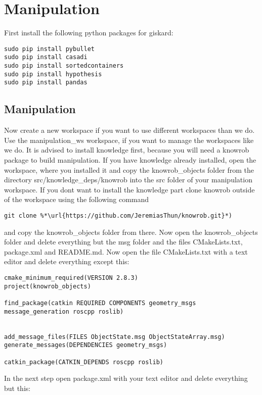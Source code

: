\documentclass[main.tex]{subfiles}
\begin{document}
\section{Manipulation}
\label{sec:Manipulation}

First install the following python packages for giskard:\\

\begin{lstlisting}
sudo pip install pybullet
sudo pip install casadi
sudo pip install sortedcontainers
sudo pip install hypothesis
sudo pip install pandas
\end{lstlisting}
	
	\subsection{Manipulation}
Now create a new workspace if you want to use different workspaces than we do. Use the manipulation\_ws workspace, if you want to manage the workspaces like we do.
It is advised to install knowledge first, because you will need a knowrob package to build manipulation.
If you have knowledge already installed, open the workspace, where you installed it and copy the knowrob\_objects folder from the directory src/knowledge\_deps/knowrob into the src folder of your manipulation workspace. If you dont want to install the knowledge part clone knowrob outside of the workspace using the following command\\
\begin{lstlisting}
git clone %*\url{https://github.com/JeremiasThun/knowrob.git}*)
\end{lstlisting}
and copy the knowrob\_objects folder from there.
 Now open the knowrob\_objects folder and delete everything but  the msg folder and the files CMakeLists.txt, package.xml and README.md.
Now open the file CMakeLists.txt with a text editor and delete everything except this:\\
\begin{lstlisting}
cmake_minimum_required(VERSION 2.8.3)
project(knowrob_objects)

find_package(catkin REQUIRED COMPONENTS geometry_msgs message_generation roscpp roslib)


add_message_files(FILES ObjectState.msg ObjectStateArray.msg)
generate_messages(DEPENDENCIES geometry_msgs)

catkin_package(CATKIN_DEPENDS roscpp roslib)
\end{lstlisting}
In the next step open package.xml with your text editor and delete everything but this:\\
\end{document}
